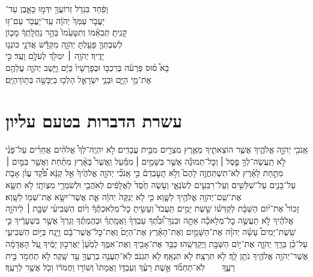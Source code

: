 \documentclass[11pt, openany]{book}
\begin{document}
וָפַ֔חַד \hfill בִּגְדֹ֥ל זְרוֹעֲךָ֖ יִדְּמ֣וּ כָּאָ֑בֶן \hfill עַד־\\
יַעֲבֹ֤ר עַמְּךָ֙ יְהֹוָ֔ה \hfill עַֽד־יַעֲבֹ֖ר עַם־ז֥וּ \\
קָנִֽיתָ׃ \hfill תְּבִאֵ֗מוֹ וְתִטָּעֵ֙מוֹ֙ בְּהַ֣ר נַחֲלָֽתְךָ֔ \hfill מָכ֧וֹן \\
לְשִׁבְתְּךָ֛ פָּעַ֖לְתָּ יְהֹוָ֑ה \hfill מִקְּדָ֕שׁ אֲדֹנָ֖י כּוֹנְנ֥וּ \\
יָדֶֽיךָ׃ \hfill יְהֹוָ֥ה ׀ יִמְלֹ֖ךְ לְעֹלָ֥ם וָעֶֽד׃ \hfill כִּ֣י \\
	בָא֩ ס֨וּס פַּרְעֹ֜ה בְּרִכְבּ֤וֹ וּבְפָרָשָׁיו֙ בַּיָּ֔ם \hfill וַיָּ֧שֶׁב יְהֹוָ֛ה עֲלֵהֶ֖ם \\
	אֶת־מֵ֣י הַיָּ֑ם \hfill וּבְנֵ֧י יִשְׂרָאֵ֛ל הָלְכ֥וּ בַיַּבָּשָׁ֖ה בְּת֥וֹךְ\hfill הַיָּֽם׃\\\normalsize

\section*{עשרת הדברות בטעם עליון}

\label{elyon}
אָֽנֹכִ֖י יְהֹוָ֣ה אֱלֹהֶ֑יךָ אֲשֶׁ֧ר הוֹצֵאתִ֛יךָ מֵאֶ֥רֶץ מִצְרַ֖יִם מִבֵּ֥ית עֲבָדִֽים׃ לֹ֣א יִהְיֶֽה־לְךָ֩ אֱלֹהִ֨ים אֲחֵרִ֜ים עַל־פָּנַ֗י לֹ֣א תַֽעֲשֶׂה־לְךָ֣ פֶ֣סֶל ׀ וְכׇל־תְּמוּנָ֡ה אֲשֶׁ֣ר בַּשָּׁמַ֣יִם ׀ מִמַּ֡עַל וַֽאֲשֶׁר֩ בָּאָ֨רֶץ מִתַּ֜חַת וַאֲשֶׁ֥ר בַּמַּ֣יִם ׀ מִתַּ֣חַת לָאָ֗רֶץ לֹֽא־תִשְׁתַּחֲוֶ֣ה לָהֶם֮ וְלֹ֣א תׇעׇבְדֵם֒ כִּ֣י אָֽנֹכִ֞י יְהֹוָ֤ה אֱלֹהֶ֙יךָ֙ אֵ֣ל קַנָּ֔א פֹּ֠קֵ֠ד עֲוֺ֨ן אָבֹ֧ת עַל־בָּנִ֛ים עַל־שִׁלֵּשִׁ֥ים וְעַל־רִבֵּעִ֖ים לְשֹׂנְאָ֑י וְעֹ֤שֶׂה חֶ֙סֶד֙ לַאֲלָפִ֔ים לְאֹהֲבַ֖י וּלְשֹׁמְרֵ֥י מִצְוֺתָֽי׃ \setuma
לֹ֥א תִשָּׂ֛א אֶת־שֵֽׁם־יְהֹוָ֥ה אֱלֹהֶ֖יךָ לַשָּׁ֑וְא כִּ֣י לֹ֤א יְנַקֶּה֙ יְהֹוָ֔ה אֵ֛ת אֲשֶׁר־יִשָּׂ֥א אֶת־שְׁמ֖וֹ לַשָּֽׁוְא׃ \petucha
\\
זָכוֹר֩ אֶת־י֨וֹם הַשַּׁבָּ֜ת לְקַדְּשׁ֗וֹ שֵׁ֣שֶׁת יָמִ֣ים תַּֽעֲבֹד֮ וְעָשִׂ֣יתָ כׇל־מְלַאכְתֶּ֒ךָ֒ וְי֨וֹם הַשְּׁבִיעִ֜י שַׁבָּ֣ת ׀ לַיהֹוָ֣ה אֱלֹהֶ֗יךָ לֹ֣א תַעֲשֶׂ֣ה כׇל־מְלָאכָ֡ה אַתָּ֣ה וּבִנְךָֽ־וּ֠בִתֶּ֠ךָ עַבְדְּךָ֨ וַאֲמָֽתְךָ֜ וּבְהֶמְתֶּ֗ךָ וְגֵרְךָ֙ אֲשֶׁ֣ר בִּשְׁעָרֶ֔יךָ כִּ֣י שֵֽׁשֶׁת־יָמִים֩ עָשָׂ֨ה יְהֹוָ֜ה אֶת־הַשָּׁמַ֣יִם וְאֶת־הָאָ֗רֶץ אֶת־הַיָּם֙ וְאֶת־כׇּל־אֲשֶׁר־בָּ֔ם וַיָּ֖נַח בַּיּ֣וֹם הַשְּׁבִיעִ֑י עַל־כֵּ֗ן בֵּרַ֧ךְ יְהֹוָ֛ה אֶת־י֥וֹם הַשַּׁבָּ֖ת וַֽיְקַדְּשֵֽׁהוּ׃\setuma
כַּבֵּ֥ד אֶת־אָבִ֖יךָ וְאֶת־אִמֶּ֑ךָ לְמַ֙עַן֙ יַאֲרִכ֣וּן יָמֶ֔יךָ עַ֚ל הָאֲדָמָ֔ה אֲשֶׁר־יְהֹוָ֥ה אֱלֹהֶ֖יךָ נֹתֵ֥ן לָֽךְ׃ \setuma
לֹ֖א תִּרְצָֽח׃ \setuma
לֹ֖א תִּנְאָֽף׃ \setuma
לֹ֖א תִּגְנֹֽב׃ \setuma
לֹֽא־תַעֲנֶ֥ה בְרֵעֲךָ֖ עֵ֥ד שָֽׁקֶר׃ \setuma
לֹ֥א תַחְמֹ֖ד בֵּ֣ית רֵעֶ֑ךָ  לֹֽא־תַחְמֹ֞ד אֵ֣שֶׁת רֵעֶ֗ךָ וְעַבְדּ֤וֹ וַאֲמָתוֹ֙ וְשׁוֹר֣וֹ וַחֲמֹר֔וֹ וְכֹ֖ל אֲשֶׁ֥ר לְרֵעֶֽךָ׃ \petucha
\clearpage
\fancyhead[C]{\haftarahname}





\end{document}
